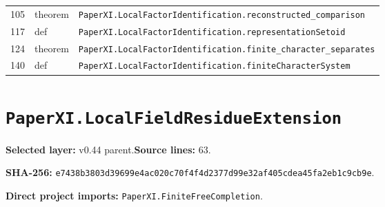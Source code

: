 \documentclass[10pt,oneside]{book}
\begin{document}
\begin{longtable}{@{}p{}p{}p{}@{}}
105&theorem&\nolinkurl{PaperXI.LocalFactorIdentification.reconstructed_comparison}\\

117&def&\nolinkurl{PaperXI.LocalFactorIdentification.representationSetoid}\\

124&theorem&\nolinkurl{PaperXI.LocalFactorIdentification.finite_character_separates}\\

140&def&\nolinkurl{PaperXI.LocalFactorIdentification.finiteCharacterSystem}\\

\bottomrule\end{longtable}

\section{\texorpdfstring{\nolinkurl{PaperXI.LocalFieldResidueExtension}}{PaperXI.LocalFieldResidueExtension}}\label{module:PaperXI.LocalFieldResidueExtension}

\textbf{Selected layer:} v0.44 parent.\quad\textbf{Source lines:} 63.\par\textbf{SHA-256:} {\scriptsize\nolinkurl{e7438b3803d39699e4ac020c70f4f4d2377d99e32af405cdea45fa2eb1c9cb9e}}.


\textbf{Direct project imports:} \nolinkurl{PaperXI.FiniteFreeCompletion}.
\end{document}
